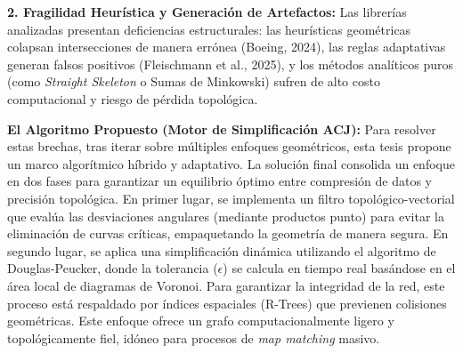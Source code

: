 \textbf{2. Fragilidad Heurística y Generación de Artefactos:}
Las librerías analizadas presentan deficiencias estructurales: las heurísticas geométricas colapsan intersecciones de manera errónea (Boeing, 2024), las reglas adaptativas generan falsos positivos (Fleischmann et al., 2025), y los métodos analíticos puros (como \textit{Straight Skeleton} o Sumas de Minkowski) sufren de alto costo computacional y riesgo de pérdida topológica.

\textbf{El Algoritmo Propuesto (Motor de Simplificación ACJ):}
Para resolver estas brechas, tras iterar sobre múltiples enfoques geométricos, esta tesis propone un marco algorítmico híbrido y adaptativo. La solución final consolida un enfoque en dos fases para garantizar un equilibrio óptimo entre compresión de datos y precisión topológica. En primer lugar, se implementa un filtro topológico-vectorial que evalúa las desviaciones angulares (mediante productos punto) para evitar la eliminación de curvas críticas, empaquetando la geometría de manera segura. En segundo lugar, se aplica una simplificación dinámica utilizando el algoritmo de Douglas-Peucker, donde la tolerancia ($\epsilon$) se calcula en tiempo real basándose en el área local de diagramas de Voronoi. Para garantizar la integridad de la red, este proceso está respaldado por índices espaciales (R-Trees) que previenen colisiones geométricas. Este enfoque ofrece un grafo computacionalmente ligero y topológicamente fiel, idóneo para procesos de \textit{map matching} masivo.
